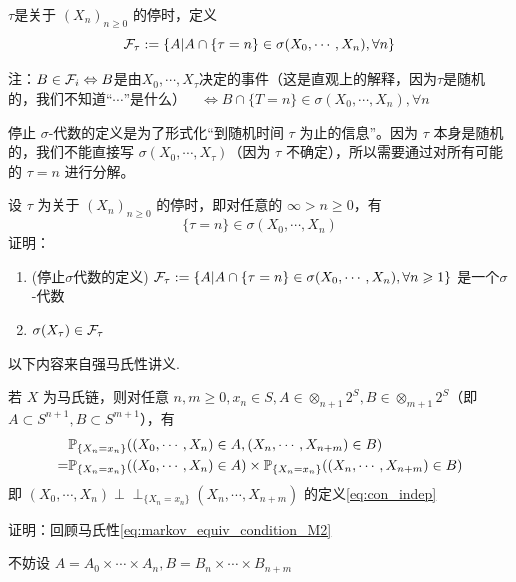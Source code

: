 \begin{definition}[停止$\sigma$代数]
    $\tau$是关于 $(X_n)_{n\geq 0}$ 的停时，定义
    \[
    \mathcal{F}_{\tau}:=\{A|A\cap\{\tau=n\}\in\sigma(X_0,\cdots,X_n),\forall n\}
    \]
\end{definition}

注：$B\in \mathcal{F}_i\Leftrightarrow B$是由$X_0,\cdots,X_{\tau}$决定的事件（这是直观上的解释，因为$\tau$是随机的，我们不知道“$\cdots$”是什么）$\quad \Leftrightarrow B\cap\{T=n\}\in \sigma(X_0,\cdots,X_n),\forall n$

停止 $\sigma$-代数的定义是为了形式化“到随机时间 $\tau$ 为止的信息”。因为 $\tau$ 本身是随机的，我们不能直接写 $\sigma(X_0,\cdots,X_{\tau})$（因为 $\tau$ 不确定），所以需要通过对所有可能的 $\tau=n$ 进行分解。

\begin{problem}[作业5-2]
设 $\tau$ 为关于 $(X_n)_{n\geq 0}$ 的停时，即对任意的 $\infty>n\geq 0$，有
\[
\{\tau=n\}\in\sigma(X_0,\cdots,X_n)
\]
证明：
\begin{enumerate}
\item (停止$\sigma$代数的定义) $\mathcal{F}_{\tau}:=\{A|A\cap \{\tau=n\}\in \sigma(X_0,\cdots,X_n),\forall n\geqslant 1\}$ 是一个$\sigma$-代数
\item $\sigma(X_{\tau})\in \mathcal{F}_{\tau}$
\end{enumerate}
\end{problem}

以下内容来自强马氏性讲义\cite{handout_SMP}.

\begin{lemma}[马氏性的小推广]\label{lem:markov_extend}
若 \( X \) 为马氏链，则对任意 \( n,m \geq 0, x_n \in S, A \in \otimes_{n+1}2^S, B \in \otimes_{m+1}2^S \)（即 \( A \subset S^{n+1}, B \subset S^{m+1} \)），有
\begin{equation}
\begin{aligned}
&\mathbb{P}_{\{X_n=x_n\}}((X_0, \cdots , X_n) \in A, (X_n, \cdots , X_{n+m}) \in B)\\
=&\mathbb{P}_{\{X_n=x_n\}}((X_0, \cdots , X_n) \in A) \times \mathbb{P}_{\{X_n=x_n\}}((X_n, \cdots , X_{n+m}) \in B)
\end{aligned}
\label{eq:markov_extend}
\end{equation}
即 \((X_0, \cdots , X_n) \perp \!\!\! \perp_{\{X_n=x_n\}} (X_n, \cdots , X_{n+m})\) 的定义\eqref{eq:con_indep}
\end{lemma}

证明：回顾马氏性\eqref{eq:markov_equiv_condition_M2}

不妨设 \( A = A_0 \times \cdots \times A_n, B = B_n \times \cdots \times B_{n+m} \)

